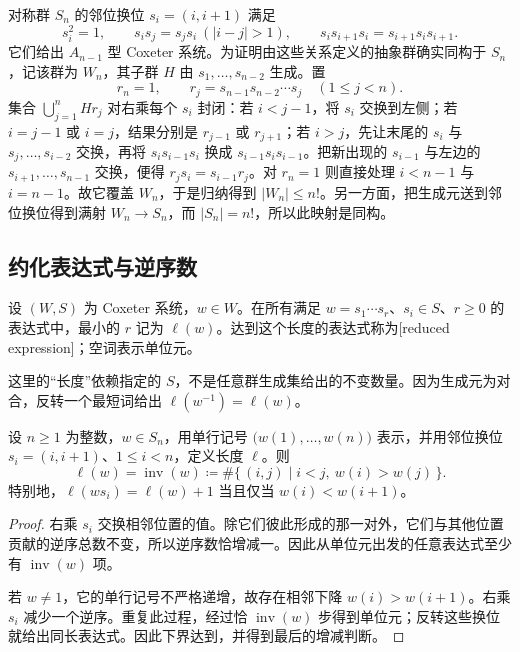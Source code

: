 \ProseParagraphBreak
对称群 \(S_n\) 的邻位换位 \(s_i=(i,i+1)\) 满足
\[
	s_i^2=1,\qquad s_is_j=s_js_i\ (|i-j|>1),\qquad s_is_{i+1}s_i=s_{i+1}s_is_{i+1}.
\]
它们给出 \(A_{n-1}\) 型 Coxeter 系统。为证明由这些关系定义的抽象群确实同构于 \(S_n\)，记该群为 \(W_n\)，其子群 \(H\) 由 \(s_1,\ldots,s_{n-2}\) 生成。置
\[
	r_n=1,\qquad r_j=s_{n-1}s_{n-2}\cdots s_j\quad(1\le j<n).
\]
集合 \(\bigcup_{j=1}^n Hr_j\) 对右乘每个 \(s_i\) 封闭：若 \(i<j-1\)，将 \(s_i\) 交换到左侧；若 \(i=j-1\) 或 \(i=j\)，结果分别是 \(r_{j-1}\) 或 \(r_{j+1}\)；若 \(i>j\)，先让末尾的 \(s_i\) 与 \(s_j,\ldots,s_{i-2}\) 交换，再将 \(s_i s_{i-1}s_i\) 换成 \(s_{i-1}s_i s_{i-1}\)。把新出现的 \(s_{i-1}\) 与左边的 \(s_{i+1},\ldots,s_{n-1}\) 交换，便得 \(r_js_i=s_{i-1}r_j\)。对 \(r_n=1\) 则直接处理 \(i<n-1\) 与 \(i=n-1\)。故它覆盖 \(W_n\)，于是归纳得到 \(|W_n|\le n!\)。另一方面，把生成元送到邻位换位得到满射 \(W_n\to S_n\)，而 \(|S_n|=n!\)，所以此映射是同构。

\subsection{约化表达式与逆序数}
\label{b5:subsec:A01:02}

\begin{definition}\label{b5:def:coxeter-length}
	设 \((W,S)\) 为 Coxeter 系统，\(w\in W\)。在所有满足 \(w=s_1\cdots s_r\)、\(s_i\in S\)、\(r\ge0\) 的表达式中，最小的 \(r\) 记为 \(\ell(w)\)。达到这个长度的表达式称为[reduced expression]；空词表示单位元。
\end{definition}

这里的“长度”依赖指定的 \(S\)，不是任意群生成集给出的不变数量。因为生成元为对合，反转一个最短词给出 \(\ell(w^{-1})=\ell(w)\)。

\begin{proposition}\label{b5:prop:permutation-length-inversions}
	设 \(n\ge1\) 为整数，\(w\in S_n\)，用单行记号 \(\bigl(w(1),\ldots,w(n)\bigr)\) 表示，并用邻位换位 \(s_i=(i,i+1)\)、\(1\le i<n\)，定义长度 \(\ell\)。则
	\[
		\ell(w)=\operatorname{inv}(w) \coloneqq\#\bigl\{\,(i,j)\mid i<j,\ w(i)>w(j)\,\bigr\}.
	\]
	特别地，\(\ell(ws_i)=\ell(w)+1\) 当且仅当 \(w(i)<w(i+1)\)。
\end{proposition}
\begin{proof}
	右乘 \(s_i\) 交换相邻位置的值。除它们彼此形成的那一对外，它们与其他位置贡献的逆序总数不变，所以逆序数恰增减一。因此从单位元出发的任意表达式至少有 \(\operatorname{inv}(w)\) 项。

	若 \(w\ne1\)，它的单行记号不严格递增，故存在相邻下降 \(w(i)>w(i+1)\)。右乘 \(s_i\) 减少一个逆序。重复此过程，经过恰 \(\operatorname{inv}(w)\) 步得到单位元；反转这些换位就给出同长表达式。因此下界达到，并得到最后的增减判断。
\end{proof}

